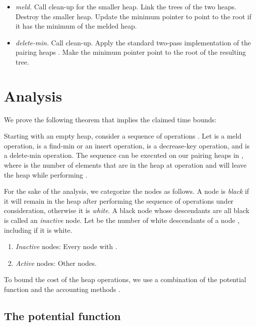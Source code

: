\begin{itemize}

\item{\it meld.}
Call clean-up for the smaller heap. Link the trees of the two heaps. Destroy the smaller heap. Update the minimum pointer to point to the root if it has the minimum of the melded heap. 

\item{\it delete-min.}
Call clean-up. Apply the standard two-pass implementation of the pairing heaps \cite{fsst}. 
Make the minimum pointer point to the root of the resulting tree.


\end{itemize}




\section{Analysis}

We prove the following theorem that implies the claimed time bounds:

\begin{theorem}
Starting with an empty heap, consider a sequence of operations . Let  is a meld operation,  is a find-min or an insert operation,  is a decrease-key operation, and  is a delete-min operation. The sequence  can be executed on our pairing heaps in , where  is the number of elements that are in the heap at operation  and will leave the heap while performing . 
\end{theorem}

For the sake of the analysis, we categorize the nodes as follows. A node is {\it black} if it will remain in the heap after performing the sequence of operations under consideration, otherwise it is {\it white}. A black node whose descendants are all black is called an {\it inactive} node.
Let  be the number of white descendants of a node , including  if it is white.

\begin{enumerate} 
\item {\it Inactive} nodes: Every node  with .
\item {\it Active} nodes: Other nodes. 
\end{enumerate}  


To bound the cost of the heap operations, we use a combination of the potential function and the accounting methods \cite{t}.

\subsection{The potential function}  


